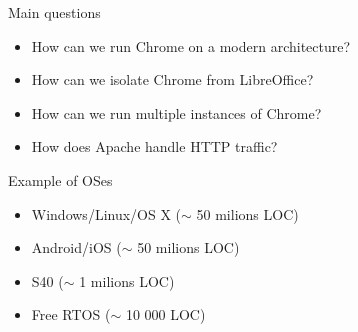 \documentclass{beamer}
\begin{document}
\begin{frame}{Main questions}
  \begin{itemize}
    \item How can we run Chrome on a modern architecture?
    \item How can we isolate Chrome from LibreOffice?
    \item How can we run multiple instances of Chrome?
    \item How does Apache handle HTTP traffic?
  \end{itemize}
\end{frame}

\begin{frame}[t]{Example of OSes}
  \begin{itemize}
  \item Windows/Linux/OS X ($\sim$ 50 milions LOC)
  \item Android/iOS ($\sim$ 50 milions LOC)
  \item<2-> S40 ($\sim$ 1 milions LOC)
  \item<3-> Free RTOS ($\sim$ 10 000 LOC)
  \end{itemize}
  \begin{center}
  \end{center}
\end{frame}
\end{document}
